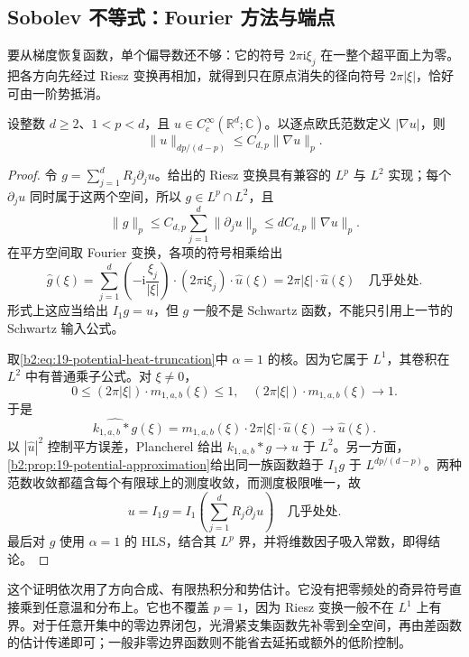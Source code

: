 \subsection{Sobolev 不等式：Fourier 方法与端点}
\label{b2:subsec:190202}

要从梯度恢复函数，单个偏导数还不够：它的符号 \(2\pi\mathrm i\xi_j\) 在一整个超平面上为零。把各方向先经过 Riesz 变换再相加，就得到只在原点消失的径向符号 \(2\pi|\xi|\)，恰好可由一阶势抵消。
\begin{theorem}\label{b2:thm:19-sobolev}
设整数 \(d\geq2\)、\(1<p<d\)，且 \(u\in C_c^\infty(\mathbb R^d;\mathbb C)\)。以逐点欧氏范数定义 \(|\nabla u|\)，则
\[
 \|u\|_{dp/(d-p)}\leq C_{d,p}\|\nabla u\|_p.
\]
\end{theorem}
\begin{proof}
令 \(g=\sum_{j=1}^dR_j\partial_ju\)。给出的 Riesz 变换具有兼容的 \(L^p\) 与 \(L^2\) 实现；每个 \(\partial_ju\) 同时属于这两个空间，所以 \(g\in L^p\cap L^2\)，且
\[
 \|g\|_p\leq C_{d,p}\sum_{j=1}^d\|\partial_ju\|_p
 \leq dC_{d,p}\|\nabla u\|_p.
\]
在平方空间取 Fourier 变换，各项的符号相乘给出
\[
 \widehat g(\xi)
 =\sum_{j=1}^d
   \left(-\mathrm i\frac{\xi_j}{|\xi|}\right)
   \cdot(2\pi\mathrm i\xi_j)\cdot\widehat u(\xi)
 =2\pi|\xi|\cdot\widehat u(\xi)
 \quad\text{几乎处处}.
\]
形式上这应当给出 \(I_1g=u\)，但 \(g\) 一般不是 Schwartz 函数，不能只引用上一节的 Schwartz 输入公式。

取\eqref{b2:eq:19-potential-heat-truncation}中 \(\alpha=1\) 的核。因为它属于 \(L^1\)，其卷积在 \(L^2\) 中有普通乘子公式。对 \(\xi\ne0\)，
\[
 0\leq(2\pi|\xi|)\cdot m_{1,a,b}(\xi)\leq1,
 \quad
 (2\pi|\xi|)\cdot m_{1,a,b}(\xi)\longrightarrow1.
\]
于是
\[
 \widehat{k_{1,a,b}*g}(\xi)
 =m_{1,a,b}(\xi)\cdot2\pi|\xi|\cdot\widehat u(\xi)
 \longrightarrow\widehat u(\xi).
\]
以 \(|\widehat u|^2\) 控制平方误差，Plancherel 给出 \(k_{1,a,b}*g\to u\) 于 \(L^2\)。另一方面，\cref{b2:prop:19-potential-approximation}给出同一族函数趋于 \(I_1g\) 于 \(L^{dp/(d-p)}\)。两种范数收敛都蕴含每个有限球上的测度收敛，而测度极限唯一，故
\[
 u=I_1g=I_1\left(\sum_{j=1}^dR_j\partial_ju\right)
 \quad\text{几乎处处}.
\]
最后对 \(g\) 使用 \(\alpha=1\) 的 HLS，结合其 \(L^p\) 界，并将维数因子吸入常数，即得结论。
\end{proof}
这个证明依次用了方向合成、有限热积分和势估计。它没有把零频处的奇异符号直接乘到任意温和分布上。它也不覆盖 \(p=1\)，因为 Riesz 变换一般不在 \(L^1\) 上有界。对于任意开集中的零边界闭包，光滑紧支集函数先补零到全空间，再由差函数的估计传递即可；一般非零边界函数则不能省去延拓或额外的低阶控制。

